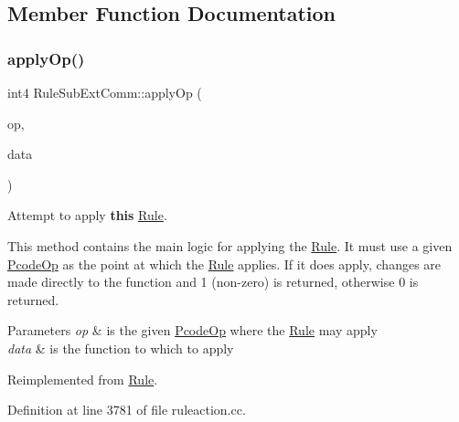 \subsection{Member Function Documentation}
\mbox{\label{class_rule_sub_ext_comm_a3a2efa5df8447bd6c5423d5829a36de0}} 
\subsubsection{\texorpdfstring{applyOp()}{applyOp()}}
{\footnotesize\ttfamily int4 Rule\+Sub\+Ext\+Comm\+::apply\+Op (\begin{DoxyParamCaption}\item[{\mbox{\hyperlink{class_pcode_op}{Pcode\+Op}} $\ast$}]{op,  }\item[{\mbox{\hyperlink{class_funcdata}{Funcdata}} \&}]{data }\end{DoxyParamCaption})\hspace{0.3cm}{\ttfamily [virtual]}}



Attempt to apply {\bfseries{this}} \mbox{\hyperlink{class_rule}{Rule}}. 

This method contains the main logic for applying the \mbox{\hyperlink{class_rule}{Rule}}. It must use a given \mbox{\hyperlink{class_pcode_op}{Pcode\+Op}} as the point at which the \mbox{\hyperlink{class_rule}{Rule}} applies. If it does apply, changes are made directly to the function and 1 (non-\/zero) is returned, otherwise 0 is returned. 
\begin{DoxyParams}{Parameters}
{\em op} & is the given \mbox{\hyperlink{class_pcode_op}{Pcode\+Op}} where the \mbox{\hyperlink{class_rule}{Rule}} may apply \\
\hline
{\em data} & is the function to which to apply \\
\hline
\end{DoxyParams}


Reimplemented from \mbox{\hyperlink{class_rule_a4e3e61f066670175009f60fb9dc60848}{Rule}}.



Definition at line 3781 of file ruleaction.\+cc.

